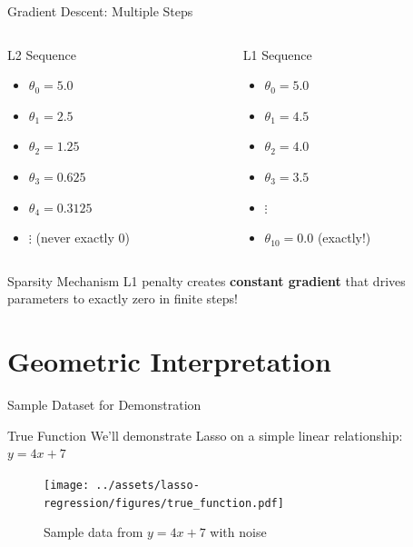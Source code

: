 \documentclass{beamer}
\begin{document}
\begin{frame}{Gradient Descent: Multiple Steps}
\begin{columns}
\begin{column}{0.5\textwidth}
\begin{keypointsbox}{L2 Sequence}
\begin{itemize}
\item $\theta_0 = 5.0$
\item $\theta_1 = 2.5$ 
\item $\theta_2 = 1.25$
\item $\theta_3 = 0.625$
\item $\theta_4 = 0.3125$
\item $\vdots$ (never exactly 0)
\end{itemize}
\end{keypointsbox}
\end{column}

\begin{column}{0.5\textwidth}
\begin{keypointsbox}{L1 Sequence}
\begin{itemize}
\item $\theta_0 = 5.0$
\item $\theta_1 = 4.5$
\item $\theta_2 = 4.0$
\item $\theta_3 = 3.5$
\item $\vdots$
\item $\theta_{10} = 0.0$ (exactly!)
\end{itemize}
\end{keypointsbox}
\end{column}
\end{columns}

\begin{theorembox}{Sparsity Mechanism}
L1 penalty creates \textbf{constant gradient} that drives parameters to exactly zero in finite steps!
\end{theorembox}
\end{frame}

\section{Geometric Interpretation}

\begin{frame}{Sample Dataset for Demonstration}
\begin{examplebox}{True Function}
We'll demonstrate Lasso on a simple linear relationship: $y = 4x + 7$
\end{examplebox}

\begin{figure}
    \centering
    \texttt{[image: ../assets/lasso-regression/figures/true\_function.pdf]}
    \caption{{\footnotesize Sample data from $y = 4x + 7$ with noise}}
    \label{fig:my_label}
\end{figure}
\end{frame}
\end{document}
